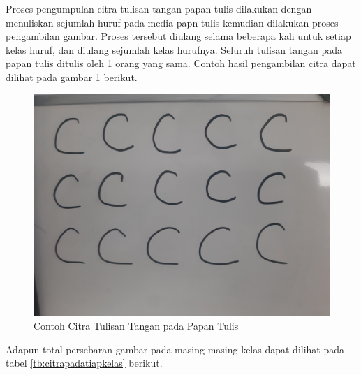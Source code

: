 Proses pengumpulan citra tulisan tangan papan tulis dilakukan dengan menuliskan sejumlah huruf pada media papn tulis kemudian dilakukan proses pengambilan gambar. Proses tersebut diulang selama beberapa kali untuk setiap kelas huruf, dan diulang sejumlah kelas hurufnya. Seluruh tulisan tangan pada papan tulis ditulis oleh 1 orang yang sama. Contoh hasil pengambilan citra dapat dilihat pada gambar \ref{fig:contohcitratulisantangan} berikut. \par

\begin{figure}[H]
  \centering
  \includegraphics[scale=0.03]{gambar/c_dataset.jpg}
  \caption{Contoh Citra Tulisan Tangan pada Papan Tulis}
  \label{fig:contohcitratulisantangan}
\end{figure}

Adapun total persebaran gambar pada masing-masing kelas dapat dilihat pada tabel \ref{tb:citrapadatiapkelas} berikut. \par

